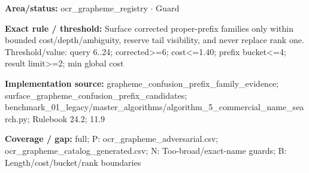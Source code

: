 \begin{tcolorbox}[enhanced,breakable,colback=white,colframe=Muted!45,boxrule=0.45pt,arc=1.5pt,left=6pt,right=6pt,top=5pt,bottom=5pt,title={\texttt{OCR-PREFIX-SURFACE-15}},title after break={\texttt{OCR-PREFIX-SURFACE-15}\ (continued)},fonttitle=\headingfont\bfseries\color{Navy},coltitle=Navy]
\textbf{Area/status:} ocr\_\allowbreak{}grapheme\_\allowbreak{}registry $\boldsymbol{\cdot}$ Guard\par
\smallskip
\textbf{Exact rule / threshold:} Surface corrected proper-prefix families only within bounded cost/\allowbreak{}depth/\allowbreak{}ambiguity, reserve tail visibility, and never replace rank one. Threshold/\allowbreak{}value: query 6..24; corrected>=6; cost<=1.40; prefix bucket<=4; result limit>=2; min global cost\par
\smallskip
\textbf{Implementation source:} grapheme\_\allowbreak{}confusion\_\allowbreak{}prefix\_\allowbreak{}family\_\allowbreak{}evidence; surface\_\allowbreak{}grapheme\_\allowbreak{}confusion\_\allowbreak{}prefix\_\allowbreak{}candidates; benchmark\_\allowbreak{}01\_\allowbreak{}legacy/\allowbreak{}master\_\allowbreak{}algorithms/\allowbreak{}algorithm\_\allowbreak{}5\_\allowbreak{}commercial\_\allowbreak{}name\_\allowbreak{}search.py; Rulebook 24.2; 11.9\par
\smallskip
\textbf{Coverage / gap:} full; P: ocr\_\allowbreak{}grapheme\_\allowbreak{}adversarial.csv; ocr\_\allowbreak{}grapheme\_\allowbreak{}catalog\_\allowbreak{}generated.csv; N: Too-broad/\allowbreak{}exact-name guards; B: Length/\allowbreak{}cost/\allowbreak{}bucket/\allowbreak{}rank boundaries
\end{tcolorbox}
